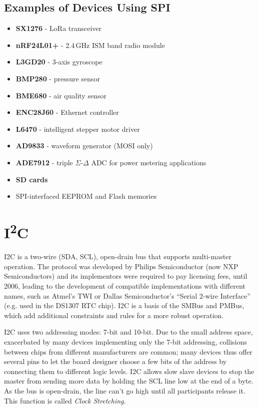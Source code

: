 \subsection{Examples of Devices Using SPI}

\begin{itemize}
	\item \textbf{SX1276} - LoRa transceiver
	\item \textbf{nRF24L01+} - 2.4\,GHz ISM band radio module
	\item \textbf{L3GD20} - 3-axis gyroscope
	\item \textbf{BMP280} - pressure sensor
	\item \textbf{BME680} - air quality sensor
	\item \textbf{ENC28J60} - Ethernet controller
	\item \textbf{L6470} - intelligent stepper motor driver
	\item \textbf{AD9833} - waveform generator (\gls{MOSI} only)
	\item \textbf{ADE7912} - triple $\Sigma$-$\Delta$ \gls{ADC} for power metering applications
	\item \textbf{SD cards}
	\item SPI-interfaced EEPROM and Flash memories
\end{itemize}

\section{I\textsuperscript{2}C} \label{sec:theory-i2c}

\acrfull{I2C} is a two-wire (\gls{SDA}, \gls{SCL}), open-drain bus that supports multi-master operation. The protocol was developed by Philips Semiconductor (now NXP Semiconductors) and its implementors were required to pay licensing fees, until 2006, leading to the development of compatible implementations with different names, such as Atmel's \gls{TWI} or Dallas Semiconductor's ``Serial 2-wire Interface'' (e.g. used in the DS1307 \gls{RTC} chip). \gls{I2C} is a basis of the \gls{SMBus} and \gls{PMBus}, which add additional constraints and rules for a more robust operation.

\gls{I2C} uses two addressing modes: 7-bit and 10-bit. Due to the small address space, exacerbated by many devices implementing only the 7-bit addressing, collisions between chips from different manufacturers are common; many devices thus offer several pins to let the board designer choose a few bits of the address by connecting them to different logic levels. \gls{I2C} allows slow slave devices to stop the master from sending more data by holding the SCL line low at the end of a byte. As the bus is open-drain, the line can't go high until all participants release it. This function is called \textit{Clock Stretching}.

